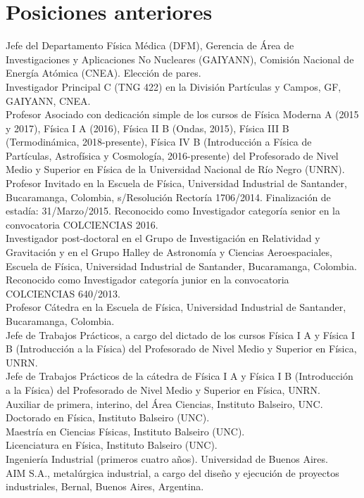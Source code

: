 \else

\section*{Posiciones anteriores}
\noindent
{} Jefe del Departamento Física Médica (DFM), Gerencia de Área de Investigaciones y Aplicaciones No Nucleares (GAIYANN), Comisión Nacional de Energía Atómica (CNEA). Elección de pares.\\
 Investigador Principal C (TNG 422) en la División Partículas y Campos, GF, GAIYANN, CNEA.\\
 Profesor Asociado con dedicación simple de los cursos de Física Moderna A (2015 y 2017), Física I A (2016), Física II B (Ondas, 2015), Física III B (Termodinámica, 2018-presente), Física IV B (Introducción a Física de Partículas, Astrofísica y Cosmología, 2016-presente) del Profesorado de Nivel Medio y Superior en Física de la Universidad Nacional de Río Negro (UNRN).\\
 Profesor Invitado en la Escuela de Física, Universidad Industrial de Santander, Bucaramanga, Colombia, s/Resolución Rectoría 1706/2014. Finalización de estadía: 31/Marzo/2015. Reconocido como Investigador categoría senior en la convocatoria COLCIENCIAS 2016.\\
 Investigador post-doctoral en el Grupo de Investigación en Relatividad y Gravitación y en el Grupo Halley de Astronomía y Ciencias Aeroespaciales, Escuela de Física, Universidad Industrial de Santander, Bucaramanga, Colombia. Reconocido como Investigador categoría junior en la convocatoria COLCIENCIAS 640/2013.\\
 Profesor Cátedra en la Escuela de Física, Universidad Industrial de Santander, Bucaramanga, Colombia.\\
 Jefe de Trabajos Prácticos, a cargo del dictado de los cursos Física I A y Física I B (Introducción a la Física) del Profesorado de Nivel Medio y Superior en Física, UNRN.\\
 Jefe de Trabajos Prácticos de la cátedra de Física I A y Física I B (Introducción a la Física) del Profesorado de Nivel Medio y Superior en Física, UNRN.\\
 Auxiliar de primera, interino, del Área Ciencias, Instituto Balseiro, UNC.\\
 Doctorado en Física, Instituto Balseiro (UNC).\\
 Maestría en Ciencias Físicas, Instituto Balseiro (UNC).\\
 Licenciatura en Física, Instituto Balseiro (UNC).\\
 Ingeniería Industrial (primeros cuatro años). Universidad de Buenos Aires.\\
 AIM S.A., metalúrgica industrial, a cargo del diseño y ejecución de proyectos industriales, Bernal, Buenos Aires, Argentina.\\
\fi
\fi

